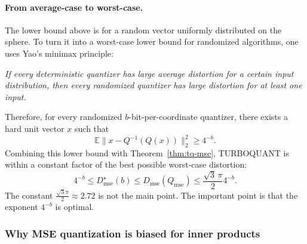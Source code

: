 \paragraph{From average-case to worst-case.}
The lower bound above is for a random vector uniformly distributed on the sphere.
To turn it into a worst-case lower bound for randomized algorithms, one uses Yao's minimax principle:
\begin{center}
\emph{If every deterministic quantizer has large average distortion for a certain input distribution, then every randomized quantizer has large distortion for at least one input.}
\end{center}
Therefore, for every randomized $b$-bit-per-coordinate quantizer, there exists a hard unit vector $x$ such that
\begin{equation}
    \mathbb E\|x-Q^{-1}(Q(x))\|_2^2\ge 4^{-b}.
\end{equation}
Combining this lower bound with Theorem~\ref{thm:tq-mse}, TURBOQUANT is within a constant factor of the best possible worst-case distortion:
\begin{equation}
    4^{-b}
    \le
    D_{\mathrm{mse}}^{\star}(b)
    \le
    D_{\mathrm{mse}}(Q_{\mathrm{mse}})
    \le
    \frac{\sqrt 3\,\pi}{2}4^{-b}.
\end{equation}
The constant $\frac{\sqrt 3\pi}{2}\approx 2.72$ is not the main point.
The important point is that the exponent $4^{-b}$ is optimal.

\subsubsection*{Why MSE quantization is biased for inner products}

